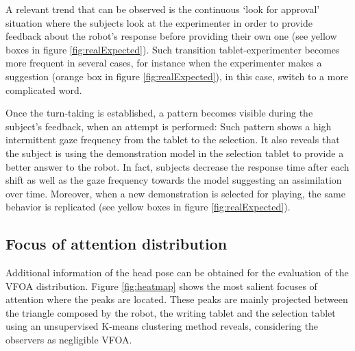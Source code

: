 \documentclass{sig-alternate}
\begin{document}
A relevant trend that can be observed is the continuous `look for approval' situation where the subjects look at the experimenter in order to provide feedback about the robot's response before providing their own one (see yellow boxes in figure \ref{fig:realExpected}). Such transition tablet-experimenter becomes more frequent in several cases, for instance when the experimenter makes a suggestion (orange box in figure \ref{fig:realExpected}), in this case, switch to a more complicated word.

Once the turn-taking is established, a pattern becomes visible during the subject's feedback, when an attempt is performed: Such pattern shows a high intermittent gaze frequency from the tablet to the selection. It also reveals that the subject is using the demonstration model in the selection tablet to provide a better answer to the robot. In fact, subjects decrease the response time after each shift as well as the gaze frequency towards the model suggesting an assimilation over time. Moreover, when a new demonstration is selected for playing, the same behavior is replicated (see yellow boxes in figure \ref{fig:realExpected}).
\\
\subsection{Focus of attention distribution}
Additional information of the head pose can be obtained for the evaluation of the VFOA distribution. Figure \ref{fig:heatmap} shows the most salient focuses of attention where the peaks are located. These peaks are mainly projected between the triangle composed by the robot, the writing tablet and the selection tablet using an unsupervised K-means clustering method reveals, considering the observers as negligible VFOA.
\end{document}

